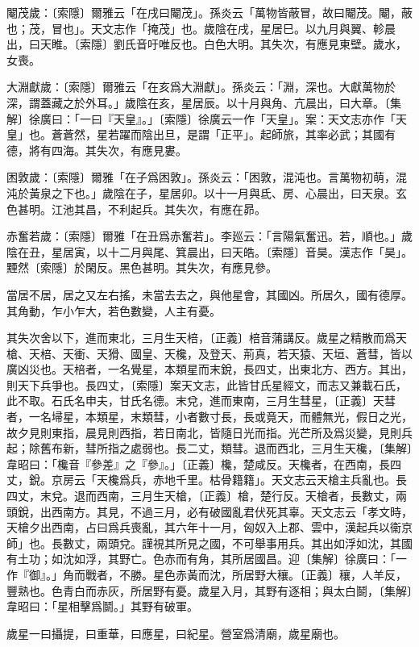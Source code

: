 閹茂歲：〔索隱〕爾雅云「在戌曰閹茂」。孫炎云「萬物皆蔽冒，故曰閹茂。閹，蔽也；茂，冒也」。天文志作「掩茂」也。歲陰在戌，星居巳。以九月與翼、軫晨出，曰天睢。〔索隱〕劉氏音吁唯反也。白色大明。其失次，有應見東壁。歲水，女喪。

大淵獻歲：〔索隱〕爾雅云「在亥爲大淵獻」。孫炎云：「淵，深也。大獻萬物於深，謂蓋藏之於外耳。」歲陰在亥，星居辰。以十月與角、亢晨出，曰大章。〔集解〕徐廣曰：「一曰『天皇』。」〔索隱〕徐廣云一作「天皇」。案：天文志亦作「天皇」也。蒼蒼然，星若躍而陰出旦，是謂「正平」。起師旅，其率必武；其國有德，將有四海。其失次，有應見婁。

困敦歲：〔索隱〕爾雅「在子爲困敦」。孫炎云：「困敦，混沌也。言萬物初萌，混沌於黃泉之下也。」歲陰在子，星居卯。以十一月與氐、房、心晨出，曰天泉。玄色甚明。江池其昌，不利起兵。其失次，有應在昴。

赤奮若歲：〔索隱〕爾雅「在丑爲赤奮若」。李廵云：「言陽氣奮迅。若，順也。」歲陰在丑，星居寅，以十二月與尾、箕晨出，曰天皓。〔索隱〕音昊。漢志作「昊」。黫然〔索隱〕於閑反。黑色甚明。其失次，有應見參。

當居不居，居之又左右搖，未當去去之，與他星會，其國凶。所居久，國有德厚。其角動，乍小乍大，若色數變，人主有憂。

其失次舍以下，進而東北，三月生天棓，〔正義〕棓音蒲講反。歲星之精散而爲天槍、天棓、天衝、天猾、國皇、天欃，及登天、荊真，若天猿、天垣、蒼彗，皆以廣凶災也。天棓者，一名覺星，本類星而末銳，長四丈，出東北方、西方。其出，則天下兵爭也。長四丈，〔索隱〕案天文志，此皆甘氏星經文，而志又兼載石氏，此不取。石氏名申夫，甘氏名德。末兌，進而東南，三月生彗星，〔正義〕天彗者，一名埽星，本類星，末類彗，小者數寸長，長或竟天，而體無光，假日之光，故夕見則東指，晨見則西指，若日南北，皆隨日光而指。光芒所及爲災變，見則兵起；除舊布新，彗所指之處弱也。長二丈，類彗。退而西北，三月生天欃，〔集解〕韋昭曰：「欃音『參差』之『參』。」〔正義〕欃，楚咸反。天欃者，在西南，長四丈，銳。京房云「天欃爲兵，赤地千里。枯骨籍籍」。天文志云天槍主兵亂也。長四丈，末兌。退而西南，三月生天槍，〔正義〕槍，楚行反。天槍者，長數丈，兩頭銳，出西南方。其見，不過三月，必有破國亂君伏死其辜。天文志云「孝文時，天槍夕出西南，占曰爲兵喪亂，其六年十一月，匈奴入上郡、雲中，漢起兵以衞京師」也。長數丈，兩頭兌。謹視其所見之國，不可舉事用兵。其出如浮如沈，其國有土功；如沈如浮，其野亡。色赤而有角，其所居國昌。迎〔集解〕徐廣曰：「一作『御』。」角而戰者，不勝。星色赤黃而沈，所居野大穰。〔正義〕穰，人羊反，豐熟也。色青白而赤灰，所居野有憂。歲星入月，其野有逐相；與太白鬬，〔集解〕韋昭曰：「星相擊爲鬬。」其野有破軍。

歲星一曰攝提，曰重華，曰應星，曰紀星。營室爲清廟，歲星廟也。

